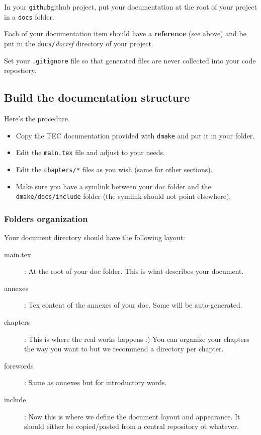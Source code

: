 In your \texttt{github}\gls{github} project,
put your documentation at the root of your project in a \texttt{docs} folder.

Each of your documentation item should have a \textbf{reference} (see above)
and be put in the \texttt{docs/}\textit{docref} directory of your project.

Set your \texttt{.gitignore} file so that generated files are never
collected into your code repostiory.

\subsection{Build the documentation structure}

Here's the procedure.

\begin{itemize}
    \item Copy the TEC documentation provided with \texttt{dmake} and put it in your folder.
    \item Edit the \texttt{main.tex} file and adjust to your needs.
    \item Edit the \texttt{chapters/*} files as you wish (same for other sections).
    \item Make sure you have a symlink between your doc folder and the \texttt{dmake/docs/include} folder (the symlink should not point elsewhere).
\end{itemize}

\subsubsection{Folders organization}

Your document directory should have the following layout:

\begin{description}
\item[main.tex]: At the root of your doc folder. This is what describes your document.
\item[annexes]: Tex content of the annexes of your doc. Some will be auto-generated.
\item[chapters]: This is where the real works happens :)
You can organize your chapters the way you want to but we recommend a directory per chapter.
\item[forewords]: Same as annexes but for introductory words.
\item[include]: Now this is where we define the document layout and appearance.
It should either be copied/pasted from a central repository ot whatever.
\end{description}

